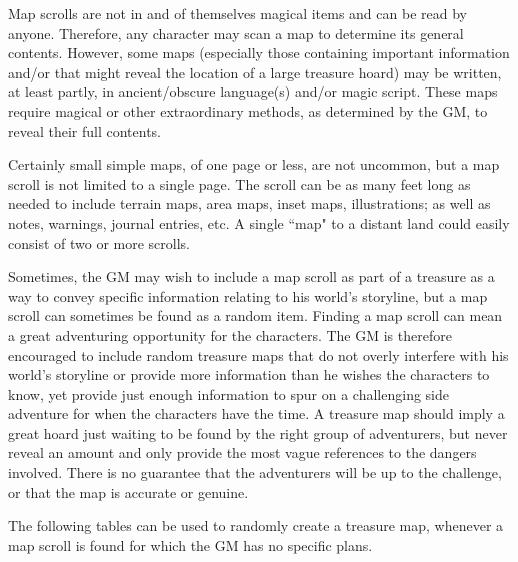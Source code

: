 \begin{multicols}{2}
Map scrolls are not in and of themselves magical items and can be read by anyone.  Therefore, any character may scan a map to determine its general contents.  However, some maps (especially those containing important information and/or that might reveal the location of a large treasure hoard) may be written, at least partly, in ancient/obscure language(s) and/or magic script.  These maps require magical or other extraordinary methods, as determined by the GM, to reveal their full contents.  

Certainly small simple maps, of one page or less, are not uncommon, but a map scroll is not limited to a single page.  The scroll can be as many feet long as needed to include terrain maps, area maps, inset maps, illustrations; as well as notes, warnings, journal entries, etc.  A single ``map" to a distant land could easily consist of two or more scrolls. 

Sometimes, the GM may wish to include a map scroll as part of a treasure as a way to convey specific information relating to his world's storyline, but a map scroll can sometimes be found as a random item.  Finding a map scroll can mean a great adventuring opportunity for the characters.  The GM is therefore encouraged to include random treasure maps that do not overly interfere with his world's storyline or provide more information than he wishes the characters to know, yet provide just enough information to spur on a challenging side adventure for when the characters have the time.  A treasure map should imply a great hoard just waiting to be found by the right group of adventurers, but never reveal an amount and only provide the most vague references to the dangers involved.  There is no guarantee that the adventurers will be up to the challenge, or that the map is accurate or genuine.

The following tables can be used to randomly create a treasure map, whenever a map scroll is found for which the GM has no specific plans.


\end{multicols}
